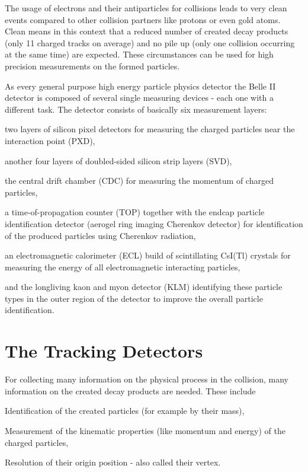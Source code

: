 The usage of electrons and their antiparticles for collisions leads to very clean events compared to other collision partners like protons or even gold atoms. Clean means in this context that a reduced number of created decay products (only 11 charged tracks on average) and no pile up (only one collision occurring at the same time) are expected. These circumstances can be used for high precision measurements on the formed particles.

As every general purpose high energy particle physics detector the Belle II detector is composed of several single measuring devices - each one with a different task. The detector consists of basically six measurement layers:
\begin{zlist}
  \item two layers of silicon pixel detectors for measuring the charged particles near the interaction point (PXD),
  \item another four layers of doubled-sided silicon strip layers (SVD),
  \item the central drift chamber (CDC) for measuring the momentum of charged particles,
  \item a time-of-propagation counter (TOP) together with the endcap particle identification detector (aerogel ring imaging Cherenkov detector) for identification of the produced particles using Cherenkov radiation,
  \item an electromagnetic calorimeter (ECL) build of scintillating CsI(Tl) crystals for measuring the energy of all electromagnetic interacting particles,
  \item and the longliving kaon and myon detector (KLM) identifying these particle types in the outer region of the detector to improve the overall particle identification.
\end{zlist}

\section{The Tracking Detectors}

For collecting many information on the physical process in the collision, many information on the created decay products are needed. These include
\begin{zlist}
 \item Identification of the created particles (for example by their mass),
 \item Measurement of the kinematic properties (like momentum and energy) of the charged particles,
 \item Resolution of their origin position - also called their vertex.
\end{zlist}


